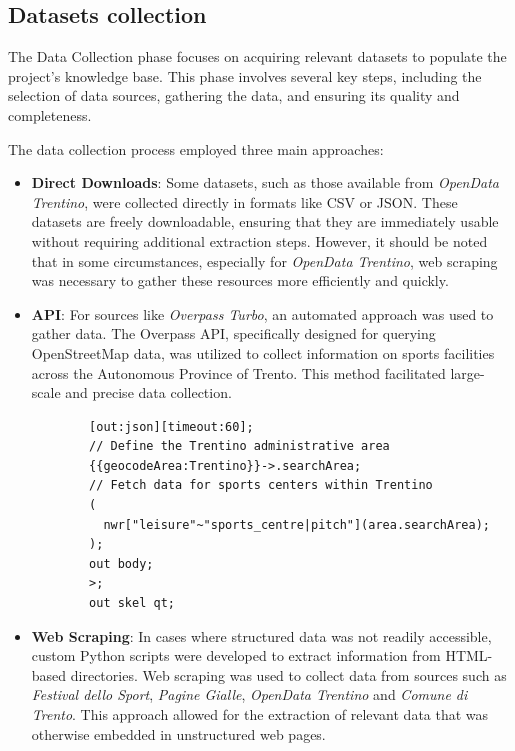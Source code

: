 \subsection{Datasets collection}
The Data Collection phase focuses on acquiring relevant datasets to populate the project's knowledge base. This phase involves several key steps, including the selection of data sources, gathering the data, and ensuring its quality and completeness.
\vspace{0.4cm}

\noindent The data collection process employed three main approaches:
\begin{itemize}
    \item \textbf{Direct Downloads}: Some datasets, such as those available from \textit{OpenData Trentino}, were collected directly in formats like CSV or JSON. These datasets are freely downloadable, ensuring that they are immediately usable without requiring additional extraction steps. However, it should be noted that in some circumstances, especially for \textit{OpenData Trentino}, web scraping was necessary to gather these resources more efficiently and quickly.
    \item \textbf{API}: For sources like \textit{Overpass Turbo}, an automated approach was used to gather data. The Overpass API, specifically designed for querying OpenStreetMap data, was utilized to collect information on sports facilities across the Autonomous Province of Trento. This method facilitated large-scale and precise data collection.
    \begin{lstlisting}
        [out:json][timeout:60];
        // Define the Trentino administrative area
        {{geocodeArea:Trentino}}->.searchArea;
        // Fetch data for sports centers within Trentino
        (
          nwr["leisure"~"sports_centre|pitch"](area.searchArea);
        );
        out body;
        >;
        out skel qt;
    \end{lstlisting}
    \item \textbf{Web Scraping}: In cases where structured data was not readily accessible, custom Python scripts were developed to extract information from HTML-based directories. Web scraping was used to collect data from sources such as \textit{Festival dello Sport}, \textit{Pagine Gialle}, \textit{OpenData Trentino} and \textit{Comune di Trento}. This approach allowed for the extraction of relevant data that was otherwise embedded in unstructured web pages.
\end{itemize}
\vspace{0.4cm}

